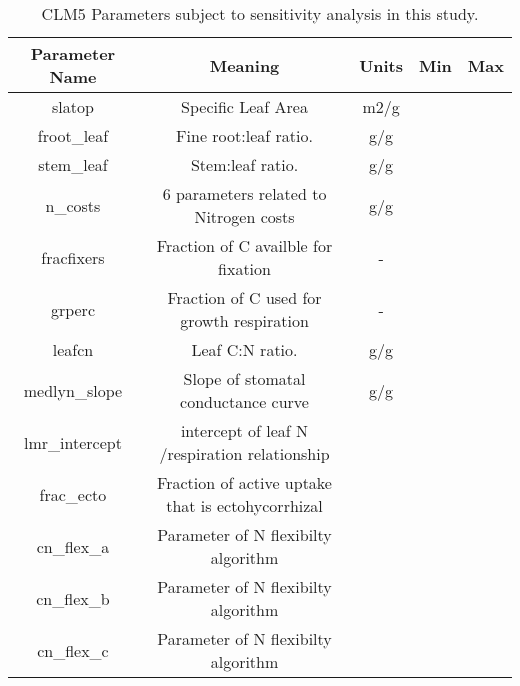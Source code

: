 \documentclass[draft,linenumbers]{agujournal}
\begin{document}
\pagebreak
\begin{table}
\begin{center}
\begin{tabular}{ |c|c|c|c|c| } 
 \hline
 Parameter Name & Meaning & Units & Min & Max \\
  \hline
 slatop & Specific Leaf Area & m2/g \\ 
 froot\_leaf & Fine root:leaf ratio. & g/g \\
 stem\_leaf  & Stem:leaf ratio. & g/g \\ 
 n\_costs    & 6 parameters related to Nitrogen costs & g/g \\
 fracfixers  & Fraction of C availble for fixation & - \\
  grperc  & Fraction of C used for growth respiration  & - \\
  leafcn  & Leaf C:N ratio. & g/g \\
     medlyn\_slope  & Slope of stomatal conductance curve & g/g \\
      lmr\_intercept & intercept of leaf N /respiration relationship &\\
      frac\_ecto & Fraction of active uptake that is ectohycorrhizal & \\
      cn\_flex\_a & Parameter of N flexibilty algorithm& \\
      cn\_flex\_b & Parameter of N flexibilty algorithm & \\
      cn\_flex\_c & Parameter of N flexibilty algorithm & \\
\hline
\end{tabular}
\end{center}
\caption{CLM5 Parameters subject to sensitivity analysis in this study. }
\label{table_parameters}
\end{table}
\end{document}
